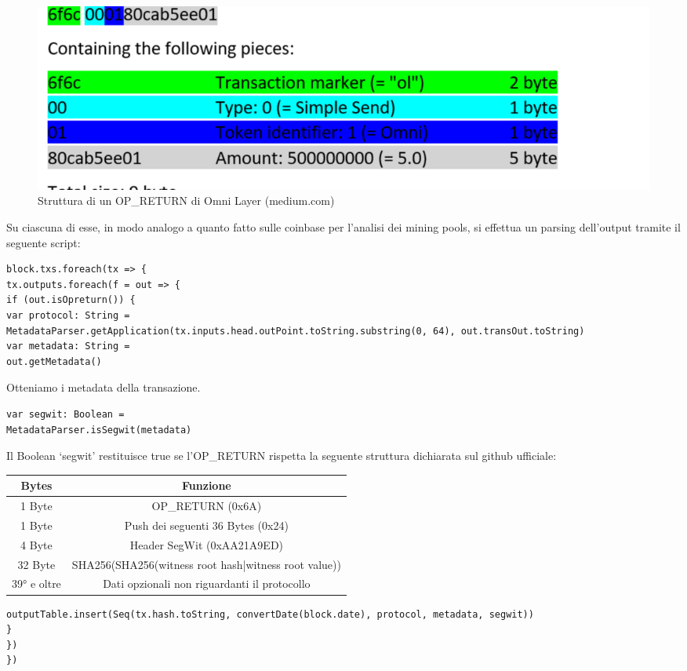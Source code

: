 \begin{figure}[h]
	\centering
	\includegraphics[width=1.0\linewidth]{images/ol-omnilayer-medium}
	\caption{Struttura di un OP\_RETURN di Omni Layer (medium.com)}
	\label{fig:ol-omnilayer-medium}
\end{figure}

Su ciascuna di esse, in modo analogo a quanto fatto sulle coinbase per l’analisi dei mining pools, si effettua un parsing dell’output tramite il seguente script:

\begin{lstlisting}
block.txs.foreach(tx => {
tx.outputs.foreach(f = out => {
if (out.isOpreturn()) {
var protocol: String =
MetadataParser.getApplication(tx.inputs.head.outPoint.toString.substring(0, 64), out.transOut.toString)
var metadata: String =
out.getMetadata()
\end{lstlisting}

Otteniamo i metadata della transazione.

\begin{lstlisting}
var segwit: Boolean =
MetadataParser.isSegwit(metadata)
\end{lstlisting}

Il Boolean ‘segwit’ restituisce true se l’OP\_RETURN rispetta la seguente struttura dichiarata sul github ufficiale:

\begin{tabular}{c|c}
	\textbf{Bytes} & \textbf{Funzione} \\ 
	\hline 
1 Byte	& OP\_RETURN (0x6A) \\ 
	\hline 
1 Byte	& Push dei seguenti 36 Bytes (0x24) \\ 
	\hline 
4 Byte	& Header SegWit (0xAA21A9ED) \\ 
	\hline 
32 Byte	& SHA256(SHA256(witness root hash|witness root value)) \\ 
	\hline 
39° e oltre	&  Dati opzionali non riguardanti il protocollo\\ 
\end{tabular} 

\begin{lstlisting}
outputTable.insert(Seq(tx.hash.toString, convertDate(block.date), protocol, metadata, segwit))
}
})
})
\end{lstlisting}
